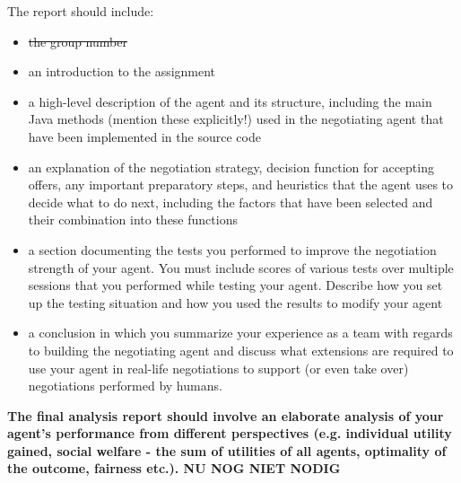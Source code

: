 \documentclass[11pt,a4paper]{report}
\begin{document}
The report should include:\\
\begin{itemize}
\item \st{the group number}
\item an introduction to the assignment
\item a high-level description of the agent and its structure, including the main Java methods (mention
these explicitly!) used in the negotiating agent that have been implemented in the source code
\item an explanation of the negotiation strategy, decision function for accepting offers, any important
preparatory steps, and heuristics that the agent uses to decide what to do next, including the factors
that have been selected and their combination into these functions
\item a section documenting the tests you performed to improve the negotiation strength of your agent.
You must include scores of various tests over multiple sessions that you performed while testing
your agent. Describe how you set up the testing situation and how you used the results to modify
your agent
\item a conclusion in which you summarize your experience as a team with regards to building the
negotiating agent and discuss what extensions are required to use your agent in real-life negotiations
to support (or even take over) negotiations performed by humans.
\end{itemize}

\textbf{The final analysis report should involve an elaborate analysis of your agent's performance from different perspectives (e.g. individual utility gained, social welfare - the sum of utilities of all agents, optimality of the outcome, fairness etc.). NU NOG NIET NODIG}
\end{document}
